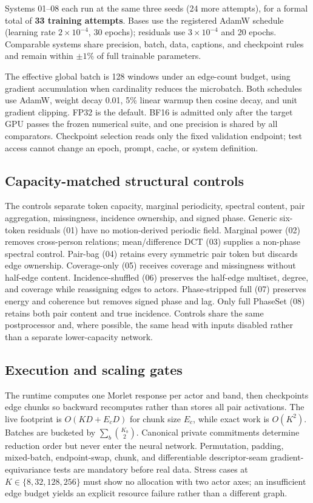 \documentclass{article}
\begin{document}
Systems 01--08 each run at the same three seeds (24 more attempts), for a
formal total of \textbf{33 training attempts}. Bases use the registered AdamW
schedule (learning rate $2\!\times\!10^{-4}$, 30 epochs); residuals use
$3\!\times\!10^{-4}$ and 20 epochs. Comparable systems share precision, batch,
data, captions, and checkpoint rules and remain within $\pm1\%$ of full
trainable parameters.

The effective global batch is 128 windows under an edge-count budget, using
gradient accumulation when cardinality reduces the microbatch. Both schedules
use AdamW, weight decay 0.01, 5\% linear warmup then cosine decay, and unit
gradient clipping. FP32 is the default. BF16 is admitted only after the target
GPU passes the frozen numerical suite, and one precision is shared by all
comparators. Checkpoint selection reads only the fixed validation endpoint;
test access cannot change an epoch, prompt, cache, or system definition.

\subsection{Capacity-matched structural controls}
The controls separate token capacity, marginal periodicity, spectral content,
pair aggregation, missingness, incidence ownership, and signed phase. Generic
six-token residuals (01) have no motion-derived periodic field. Marginal power
(02) removes cross-person relations; mean/difference DCT (03) supplies a
non-phase spectral control. Pair-bag (04) retains every symmetric pair token
but discards edge ownership. Coverage-only (05) receives coverage and
missingness without half-edge content. Incidence-shuffled (06) preserves the
half-edge multiset, degree, and coverage while reassigning edges to actors.
Phase-stripped full (07) preserves energy and coherence but removes signed
phase and lag. Only full PhaseSet (08) retains both pair content and true
incidence. Controls share the same postprocessor and, where possible, the same
head with inputs disabled rather than a separate lower-capacity network.

\subsection{Execution and scaling gates}
The runtime computes one Morlet response per actor and band, then checkpoints
edge chunks so backward recomputes rather than stores all pair activations.
The live footprint is $O(KD+E_cD)$ for chunk size $E_c$, while exact work is
$O(K^2)$. Batches are bucketed by $\sum_b \binom{K_b}{2}$. Canonical private
commitments determine reduction order but never enter the neural network.
Permutation, padding, mixed-batch, endpoint-swap, chunk, and differentiable
descriptor-seam gradient-equivariance tests are mandatory before real data. Stress cases at
$K\in\{8,32,128,256\}$ must show no allocation with two actor axes; an
insufficient edge budget yields an explicit resource failure rather than a
different graph.
\end{document}
